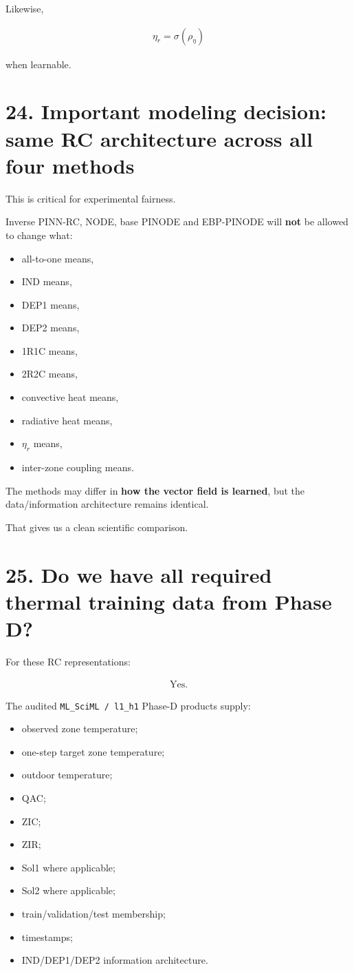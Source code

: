 \documentclass[11pt]{article}
\begin{document}
Likewise,

\begin{align}
\eta_r=\sigma(\rho_\eta)
\end{align}

when learnable.

\section*{24. Important modeling decision: same RC architecture across all four methods}

This is critical for experimental fairness.

Inverse PINN-RC, NODE, base PINODE and EBP-PINODE will \textbf{not} be allowed to change what:

\begin{itemize}
\item all-to-one means,
\item IND means,
\item DEP1 means,
\item DEP2 means,
\item 1R1C means,
\item 2R2C means,
\item convective heat means,
\item radiative heat means,
\item \(\eta_r\) means,
\item inter-zone coupling means.
\end{itemize}

The methods may differ in \textbf{how the vector field is learned}, but the data/information architecture remains identical.

That gives us a clean scientific comparison.

\section*{25. Do we have all required thermal training data from Phase D?}

For these RC representations:

\begin{align}
\boxed{\text{Yes.}}
\end{align}

The audited \texttt{ML\_SciML / l1\_h1} Phase-D products supply:

\begin{itemize}
\item observed zone temperature;
\item one-step target zone temperature;
\item outdoor temperature;
\item QAC;
\item ZIC;
\item ZIR;
\item Sol1 where applicable;
\item Sol2 where applicable;
\item train/validation/test membership;
\item timestamps;
\item IND/DEP1/DEP2 information architecture.
\end{itemize}
\end{document}
